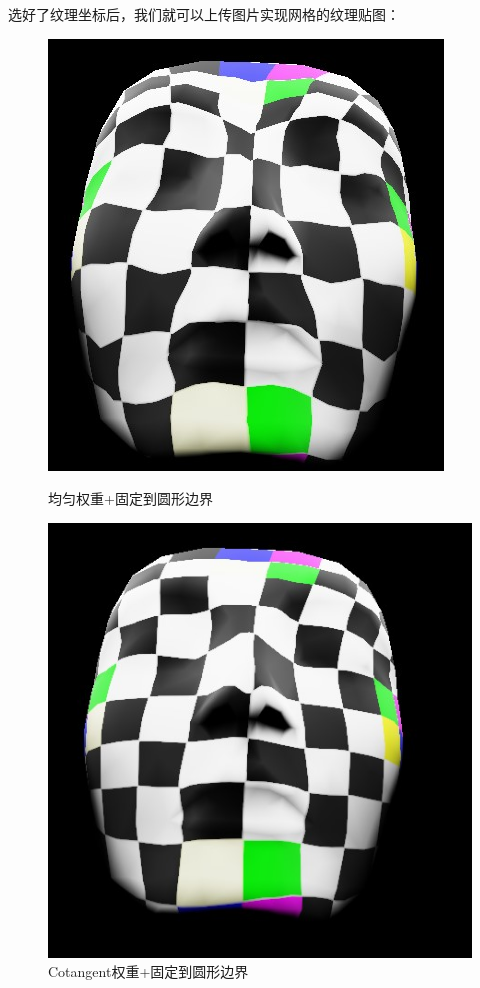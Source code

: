 \documentclass{article}
\begin{document}
	选好了纹理坐标后，我们就可以上传图片实现网格的纹理贴图：
	\begin{figure}[htbp]
		\centering
		\begin{minipage}{0.49\linewidth}
			\centering
			\includegraphics[width=0.6\linewidth]{UCtex.JPG}
			\caption{均匀权重+固定到圆形边界}
		\end{minipage}
		\begin{minipage}{0.49\linewidth}
			\centering
			\includegraphics[width=0.7\linewidth]{CCtex.JPG}
			\caption{Cotangent权重+固定到圆形边界}
		\end{minipage}
	\end{figure}
\end{document}
